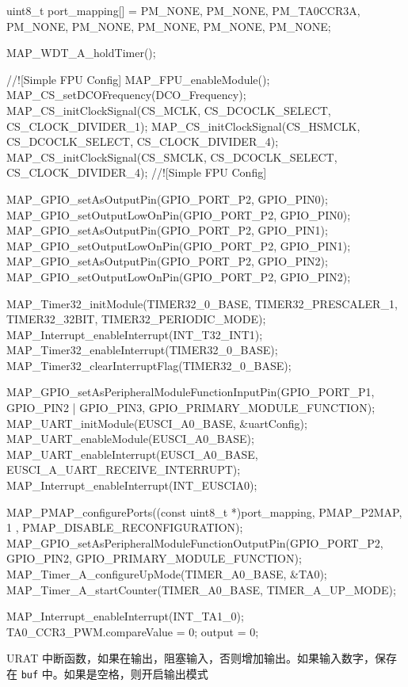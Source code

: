 \documentclass[a4paper,10pt,UTF8]{paper}
\numberwithin{equation}{section}
\numberwithin{figure}{section}
\begin{document}
\begin{ccode}
    uint8_t port_mapping[] =
    {
        PM_NONE,
        PM_NONE,
        PM_TA0CCR3A,
        PM_NONE,
        PM_NONE,
        PM_NONE,
        PM_NONE,
    PM_NONE};
                        
    MAP_WDT_A_holdTimer();
                        
    //![Simple FPU Config]
    MAP_FPU_enableModule();
    MAP_CS_setDCOFrequency(DCO_Frequency);
    MAP_CS_initClockSignal(CS_MCLK, CS_DCOCLK_SELECT, CS_CLOCK_DIVIDER_1);
    MAP_CS_initClockSignal(CS_HSMCLK, CS_DCOCLK_SELECT, CS_CLOCK_DIVIDER_4);
    MAP_CS_initClockSignal(CS_SMCLK, CS_DCOCLK_SELECT, CS_CLOCK_DIVIDER_4);
    //![Simple FPU Config]
                        
    MAP_GPIO_setAsOutputPin(GPIO_PORT_P2, GPIO_PIN0);
    MAP_GPIO_setOutputLowOnPin(GPIO_PORT_P2, GPIO_PIN0);
    MAP_GPIO_setAsOutputPin(GPIO_PORT_P2, GPIO_PIN1);
    MAP_GPIO_setOutputLowOnPin(GPIO_PORT_P2, GPIO_PIN1);
    MAP_GPIO_setAsOutputPin(GPIO_PORT_P2, GPIO_PIN2);
    MAP_GPIO_setOutputLowOnPin(GPIO_PORT_P2, GPIO_PIN2);
                        
    MAP_Timer32_initModule(TIMER32_0_BASE, TIMER32_PRESCALER_1, 
    TIMER32_32BIT, TIMER32_PERIODIC_MODE);
    MAP_Interrupt_enableInterrupt(INT_T32_INT1);
    MAP_Timer32_enableInterrupt(TIMER32_0_BASE);
    MAP_Timer32_clearInterruptFlag(TIMER32_0_BASE);
                        
    MAP_GPIO_setAsPeripheralModuleFunctionInputPin(GPIO_PORT_P1, 
    GPIO_PIN2 | GPIO_PIN3, GPIO_PRIMARY_MODULE_FUNCTION);
    MAP_UART_initModule(EUSCI_A0_BASE, &uartConfig);
    MAP_UART_enableModule(EUSCI_A0_BASE);
    MAP_UART_enableInterrupt(EUSCI_A0_BASE, EUSCI_A_UART_RECEIVE_INTERRUPT);
    MAP_Interrupt_enableInterrupt(INT_EUSCIA0);
                        
    MAP_PMAP_configurePorts((const uint8_t *)port_mapping, PMAP_P2MAP, 
    1 , PMAP_DISABLE_RECONFIGURATION);
    MAP_GPIO_setAsPeripheralModuleFunctionOutputPin(GPIO_PORT_P2, 
    GPIO_PIN2, GPIO_PRIMARY_MODULE_FUNCTION);
    MAP_Timer_A_configureUpMode(TIMER_A0_BASE, &TA0);
    MAP_Timer_A_startCounter(TIMER_A0_BASE, TIMER_A_UP_MODE);
                        
    MAP_Interrupt_enableInterrupt(INT_TA1_0);
    TA0_CCR3_PWM.compareValue = 0;
    output = 0;
\end{ccode}

URAT 中断函数，如果在输出，阻塞输入，否则增加输出。如果输入数字，保存在 \texttt{buf} 中。如果是空格，则开启输出模式
\end{document}
